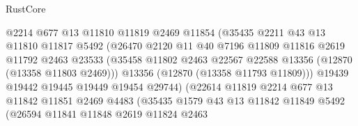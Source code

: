 \begin{lexlean}{RustCore}
\begin{coremodule}
                                @2214
                                @677
                                @13
                                @11810
                                @11819
                                @2469
                                @11854
                                (@35435
                                  @2211
                                  @43
                                  @13
                                  @11810
                                  @11817
                                  @5492
                                  (@26470
                                    @2120
                                    @11
                                    @40
                                    @7196
                                    @11809
                                    @11816
                                    @2619
                                    @11792
                                    @2463
                                    @23533
                                    (@35458
                                      @11802
                                      @2463
                                      @22567
                                      @22588
                                      @13356
                                      (@12870 (@13358 @11803 @2469)))
                                    @13356
                                    (@12870 (@13358 @11793 @11809)))
                                  @19439
                                  @19442
                                  @19445
                                  @19449
                                  @19454
                                  @29744)
                                (@22614
                                  @11819
                                  @2214
                                  @677
                                  @13
                                  @11842
                                  @11851
                                  @2469
                                  @4483
                                  (@35435
                                    @1579
                                    @43
                                    @13
                                    @11842
                                    @11849
                                    @5492
                                    (@26594
                                      @11841
                                      @11848
                                      @2619
                                      @11824
                                      @2463

\end{coremodule}
\end{lexlean}
